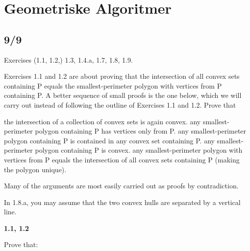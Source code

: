 \chapter{Geometriske Algoritmer}

\section{9/9}%
\label{sec:99}

Exercises (1.1, 1.2,) 1.3, 1.4.a, 1.7, 1.8, 1.9.

Exercises 1.1 and 1.2 are about proving that the intersection of all convex sets containing P equals the smallest-perimeter polygon with vertices from P containing P. A better sequence of small proofs is the one below, which we will carry out instead of following the outline of Exercises 1.1 and 1.2. Prove that

the intersection of a collection of convex sets is again convex.
any smallest-perimeter polygon containing P has vertices only from P.
any smallest-perimeter polygon containing P is contained in any convex set containing P.
any smallest-perimeter polygon containing P is convex.
any smallest-perimeter polygon with vertices from P equals the intersection of all convex sets containing P (making the polygon unique).

Many of the arguments are most easily carried out as proofs by contradiction.

In 1.8.a, you may assume that the two convex hulls are separated by a vertical line.

\noindent
\textbf{1.1, 1.2}

Prove that:

